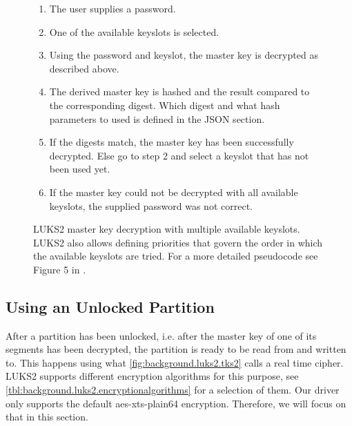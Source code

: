 \begin{figure}[htb!]
	\center
	\begin{mdframed}
		\begin{enumerate}
			\item The user supplies a password.
			\item One of the available keyslots is selected.
			\item Using the password and keyslot, the master key is decrypted as described above.
			\item The derived master key is hashed and the result compared to the corresponding digest. Which digest and what hash parameters to used is defined in the JSON section.
			\item If the digests match, the master key has been successfully decrypted. Else go to step 2 and select a keyslot that has not been used yet.
			\item If the master key could not be decrypted with all available keyslots, the supplied password was not correct.
		\end{enumerate}
	\end{mdframed}
	\caption[
		LUKS2 master key decryption with multiple available keyslots
	]{
		LUKS2 master key decryption with multiple available keyslots. LUKS2 also allows defining priorities that govern the order in which the available keyslots are tried. For a more detailed pseudocode see Figure 5 in \cite{Fruwirth2018}.
	}
	\label{fig:background.luks2.unlocking}
\end{figure}

\subsection{Using an Unlocked Partition}
\label{chap:background.luks2.using}
After a partition has been unlocked, i.e. after the master key of one of its segments has been decrypted, the partition is ready to be read from and written to. This happens using what \autoref{fig:background.luks2.tks2} calls a real time cipher. LUKS2 supports different encryption algorithms for this purpose, see \autoref{tbl:background.luks2.encryptionalgorithms} for a selection of them. Our driver only supports the default aes-xts-plain64 encryption. Therefore, we will focus on that in this section.

